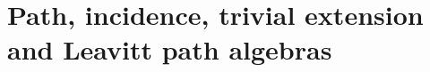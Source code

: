 \chapter{Path, incidence, trivial extension and Leavitt path algebras}\label{ch:path-incidence}





